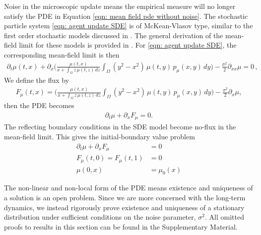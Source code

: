 \documentclass[10pt]{article}
\begin{document}
Noise in the microscopic update means the empirical measure will no longer satisfy the PDE in Equation \eqref{eqn: mean field pde without noise}. The stochastic particle system \eqref{eqn: agent update SDE} is of McKean-Vlasov type, similar to the first order stochastic models discussed in \cite{jabin_meanfieldlimit_2017}. The general derivation of the mean-field limit for these models is provided in \cite{meleard_asymptotic_1996}. For \eqref{eqn: agent update SDE}, the corresponding mean-field limit is then
\begin{align}\label{eqn: mean-field pde}
    \partial_t\mu(t,x) +\partial_x\Bigg( \frac{\mu(t,x)}{x+\int_{\Omega} z\,\mu(t,z)\,dz} \int_{\Omega} (y^2-x^2)\,\mu(t,y)\,p_\mu(x,y)\,dy\Bigg) - \frac{\sigma^2}{2}\partial_{xx}\mu = 0 \,,
\end{align}
We define the flux by
\begin{align*}
    F_\mu(t,x)=\Bigg( \frac{\mu(t,x)}{x+\int_{\Omega} z\,\mu(t,z)\,dz} \int_{\Omega} (y^2-x^2)\,\mu(t,y)\,p_\mu(x,y)\,dy\Bigg) - \frac{\sigma^2}{2}\partial_{x}\mu,
\end{align*}
then the PDE becomes
\begin{align*}
    \partial_t\mu + \partial _xF_\mu = 0.
\end{align*}
The reflecting boundary conditions in the SDE model become no-flux in the mean-field limit. This gives the initial-boundary value problem
\begin{align*}
    \partial_t\mu + \partial _xF_\mu &= 0\\
    F_\mu(t,0)= F_\mu(t,1) &= 0\\
    \mu(0,x) &=\mu_0(x)
\end{align*}

The non-linear and non-local form of the PDE means existence and uniqueness of a solution is an open problem. Since we are more concerned with the long-term dynamics, we instead rigorously prove existence and uniqueness of a stationary distribution under sufficient conditions on the noise parameter, $\sigma^2$. All omitted proofs to results in this section can be found in the Supplementary Material.
\end{document}
